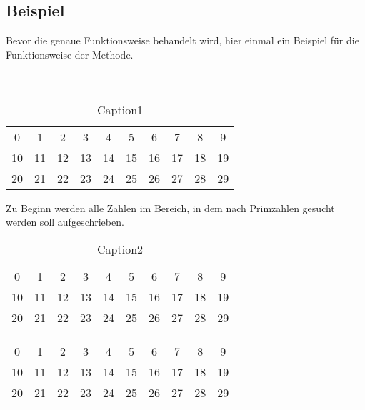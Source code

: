 \documentclass[12pt, a4paper, titlepage,twoside]{article}
\begin{document}
	\subsection{Beispiel}
	Bevor die genaue Funktionsweise behandelt wird, hier einmal ein Beispiel f\"ür die Funktionsweise der Methode.\\
	\ \\
	\ \\
	 \begin{table}[!ht] 
	 	\centering
	 	
	 		\begin{tabular}{|c|c|c|c|c|c|c|c|c|c|}
	 			\hline
	 			0  &  1 &  2 &  3 &  4 &  5 &  6 &  7 &  8 &  9 \\
	 			10 & 11 & 12 & 13 & 14 & 15 & 16 & 17 & 18 & 19 \\
	 			20 & 21 & 22 & 23 & 24 & 25 & 26 & 27 & 28 & 29 \\
	 			\hline
	 		\end{tabular}
		\caption{Caption1}
		\label{tab:eratosthenes1}
	 \end{table}
	 
	 Zu Beginn werden alle Zahlen im Bereich, in dem nach Primzahlen gesucht werden soll aufgeschrieben.
	 
	 \begin{table}[!ht] 
	 	\centering
	 		\begin{tabular}{|c|c|c|c|c|c|c|c|c|c|}
	 			\hline
	 			 \cellcolor{red}0  &  \cellcolor{red}1 &  2 &  3 &  4 &  5 &  6 &  7 &  8 &  9 \\
	 			 10 & 11 & 12 & 13 & 14 & 15 & 16 & 17 & 18 & 19 \\
	 			 20 & 21 & 22 & 23 & 24 & 25 & 26 & 27 & 28 & 29 \\
	 			\hline
	 		\end{tabular}
		\caption{Caption2}
		\label{tab:eratosthenes1}
	 \end{table}
	 		
			\vspace{8mm}
	 		\begin{tabular}{|c|c|c|c|c|c|c|c|c|c|}
	 			\hline
	 			 \cellcolor{red}0  & \cellcolor{red} 1 &  2 &  3 &  \cellcolor{red}4 &  5 & \cellcolor{red} 6 &  7 & \cellcolor{red} 8 &  9 \\
	 			 \cellcolor{red}10 & 11 & \cellcolor{red}12 & 13 & \cellcolor{red}14 & 15 & \cellcolor{red}16 & 17 & \cellcolor{red}18 & 19 \\
	 			 \cellcolor{red}20 & 21 & \cellcolor{red}22 & 23 & \cellcolor{red}24 & 25 & \cellcolor{red}26 & 27 & \cellcolor{red}28 & 29 \\
	 			 \hline
	 		\end{tabular}
	 		
\end{document}
